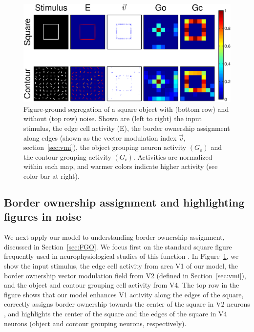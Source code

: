 \begin{figure}[t]
\centering
\includegraphics[width=\textwidth]{Contour/figs/Fig6.eps}
\makeatletter
\let\@currsize\normalsize
\caption[Figure-ground segregation with and without noise]{Figure-ground segregation of a square object with (bottom
row) and without (top row) noise. Shown are (left to right) the input
stimulus, the edge cell activity (E), the border ownership assignment along edges (shown as the vector modulation index $\vec{v}$, section~\ref{sec:vmi}), the object grouping neuron activity $(G_o)$
 and the contour grouping activity $(G_c)$.  Activities are normalized within each map, and warmer colors indicate higher activity (see color bar at right).}
\label{Fig:Square}
\end{figure}

\subsection{Border ownership assignment and highlighting figures in noise}
\label{sec:BOS}

We next apply our model to understanding border ownership assignment,
discussed in Section~\ref{sec:FGO}. We focus first on the standard
square figure frequently used in neurophysiological studies of this
function
\citep{Zhou_etal00,Qiu_etal07,Sugihara_etal11,Williford_vonderHeydt13,Williford_vonderHeydt14,Martin_vonderHeydt15}.
In Figure~\ref{Fig:Square}, we show the input stimulus, the edge cell
activity from area V1 of our model, the border ownership vector
modulation field from V2 (defined in Section~\ref{sec:vmi}), and the
object and contour grouping cell activity from V4.  The top row in the
figure shows that our model enhances V1 activity along the edges of
the square, correctly assigns border ownership towards the center of
the square in V2 neurons \citep[in agreement with][] {Zhou_etal00},
and highlights the center of the square and the edges of the square in
V4 neurons (object and contour grouping neurons, respectively).

